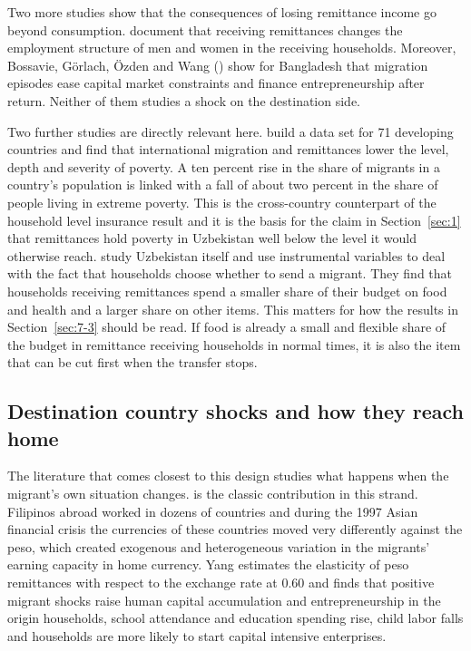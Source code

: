 Two more studies show that the consequences of losing remittance income go beyond consumption. \cite{amuedodorantes2006} document that receiving remittances changes the employment structure of men and women in the receiving households. Moreover, Bossavie, G\"orlach, \"Ozden and Wang (\citeyear{bossavie2024capital}) show for Bangladesh that migration episodes ease capital market constraints and finance entrepreneurship after return. Neither of them studies a shock on the destination side.

Two further studies are directly relevant here. \cite{adams2005} build a data set for 71 developing countries and find that international migration and remittances lower the level, depth and severity of poverty. A ten percent rise in the share of migrants in a country's population is linked with a fall of about two percent in the share of people living in extreme poverty. This is the cross-country counterpart of the household level insurance result and it is the basis for the claim in Section~\ref{sec:1} that remittances hold poverty in Uzbekistan well below the level it would otherwise reach. \cite{kakhkharov2021} study Uzbekistan itself and use instrumental variables to deal with the fact that households choose whether to send a migrant. They find that households receiving remittances spend a smaller share of their budget on food and health and a larger share on other items. This matters for how the results in Section~\ref{sec:7-3} should be read. If food is already a small and flexible share of the budget in remittance receiving households in normal times, it is also the item that can be cut first when the transfer stops.

\subsection{Destination country shocks and how they reach home}\label{sec:2-2}

The literature that comes closest to this design studies what happens when the migrant's own situation changes. \cite{yang2008} is the classic contribution in this strand. Filipinos abroad worked in dozens of countries and during the 1997 Asian financial crisis the currencies of these countries moved very differently against the peso, which created exogenous and heterogeneous variation in the migrants' earning capacity in home currency. Yang estimates the elasticity of peso remittances with respect to the exchange rate at 0.60 and finds that positive migrant shocks raise human capital accumulation and entrepreneurship in the origin households, school attendance and education spending rise, child labor falls and households are more likely to start capital intensive enterprises.

